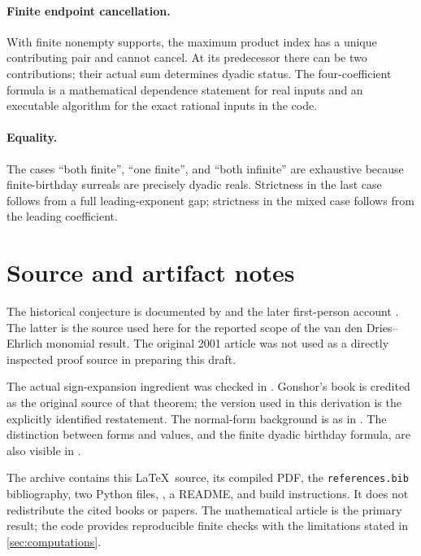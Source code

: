 \documentclass[11pt,letterpaper]{article}
\theoremstyle{definition}
\theoremstyle{remark}
\begin{document}
\paragraph{Finite endpoint cancellation.}
With finite nonempty supports, the maximum product index has a unique
contributing pair and cannot cancel. At its predecessor there can be two
contributions; their actual sum determines dyadic status. The
four-coefficient formula is a mathematical dependence statement for real
inputs and an executable algorithm for the exact rational inputs in the code.

\paragraph{Equality.}
The cases ``both finite'', ``one finite'', and ``both infinite'' are
exhaustive because finite-birthday surreals are precisely dyadic reals.
Strictness in the last case follows from a full leading-exponent gap;
strictness in the mixed case follows from the leading coefficient.

\section{Source and artifact notes}

The historical conjecture is documented by \cite{OPG} and the later
first-person account \cite{EhrlichMO}. The latter is the source used here
for the reported scope of the van den Dries--Ehrlich monomial result.
The original 2001 article was not used as a directly inspected proof
source in preparing this draft.

The actual sign-expansion ingredient was checked in
\cite[Definition~2.20 and Theorem~2.21, printed p.~13]{BournezGuilmant}.
Gonshor's book is credited as the original source of that theorem; the
version used in this derivation is the explicitly identified restatement.
The normal-form background is as in \cite{Berarducci}. The distinction
between forms and values, and the finite dyadic birthday formula, are
also visible in \cite{Roughan}.

The archive contains this \LaTeX\ source, its compiled PDF, the
\texttt{references.bib} bibliography, two Python files,
, a README, and build instructions. It does not
redistribute the cited books or papers. The mathematical article is the
primary result; the code provides reproducible finite checks with the
limitations stated in \cref{sec:computations}.
\end{document}

